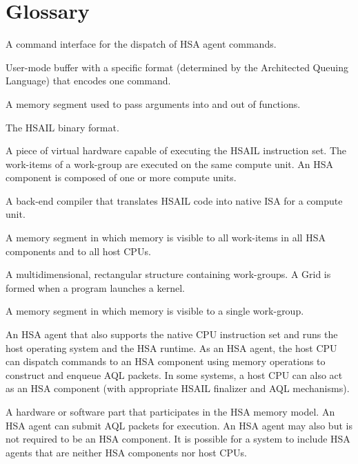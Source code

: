 \documentclass[final,oneside]{book}
\begin{document}
\chapter{Glossary}
\begin{description}[itemsep=5pt,leftmargin=0cm, labelindent=0cm]

\item[Architected Queuing Language (AQL)] A command interface for the dispatch
  of HSA agent commands.

\item[AQL packet] User-mode buffer with a specific format (determined by the
  Architected Queuing Language) that encodes one command.

\item[Arg segment] A memory segment used to pass arguments into and out of
  functions.

\item[BRIG] The HSAIL binary format.

\item[Compute unit] A piece of virtual hardware capable of executing the HSAIL
  instruction set. The work-items of a work-group are executed on the same
  compute unit. An HSA component is composed of one or more compute units.

\item[Finalizer] A back-end compiler that translates HSAIL code into native ISA
  for a compute unit.

\item[Global segment] A memory segment in which memory is visible to all
  work-items in all HSA components and to all host CPUs.

\item[Grid] A multidimensional, rectangular structure containing work-groups. A
  Grid is formed when a program launches a kernel.

\item[Group segment] A memory segment in which memory is visible to a single
  work-group.

\item[Host CPU] An HSA agent that also supports the native CPU instruction set
  and runs the host operating system and the HSA runtime. As an HSA agent, the
  host CPU can dispatch commands to an HSA component using memory operations to
  construct and enqueue AQL packets. In some systems, a host CPU can also act as
  an HSA component (with appropriate HSAIL finalizer and AQL mechanisms).

\item[HSA agent] A hardware or software part that participates in the HSA
  memory model. An HSA agent can submit AQL packets for execution. An HSA agent
  may also but is not required to be an HSA component. It is possible for a
  system to include HSA agents that are neither HSA components nor host CPUs.


\end{description}
\end{document}

